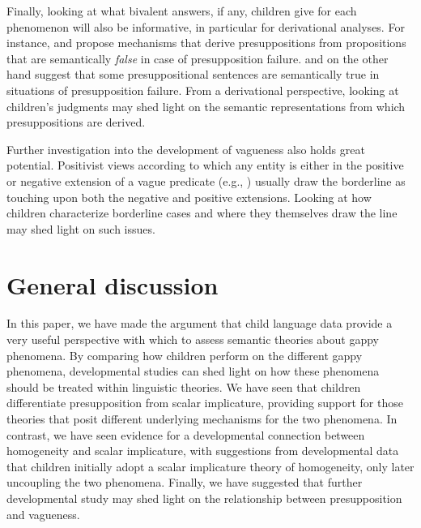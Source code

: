 \documentclass[12pt, letterpaper]{article}
\newcommand\posscite[1]{\citeauthor{#1}'s (\citeyear{#1})}
\begin{document}
{Finally, looking at what bivalent answers, if any, children give for each phenomenon will also be informative, in particular for derivational analyses. For instance, \cite{Abusch:2002} and \cite{Romoli:2014} propose mechanisms that derive presuppositions from propositions that are semantically \textit{false} in case of presupposition failure. %
\cite{sudo2012:phd} and \cite{klinedinst2010} on the other hand suggest that some presuppositional sentences are semantically true in situations of presupposition failure. From a derivational perspective, looking at children's judgments may shed light on the semantic representations from which presuppositions are derived.

Further investigation into the development of vagueness also holds great potential. Positivist views according to which any entity is either in the positive or negative extension of a vague predicate (e.g., \citealt{williamson1994:vagueness}) usually draw the borderline as touching upon both the negative and positive extensions. Looking at how children characterize borderline cases and where they themselves draw the line may shed light on such issues.


\section{General discussion}\label{discussion}

In this paper, we have made the argument that child language data provide a very useful perspective with which to assess semantic theories about gappy phenomena. By comparing how children perform on the different gappy phenomena, developmental studies can shed light on how these phenomena should be treated within linguistic theories. We have seen that children differentiate presupposition from scalar implicature, providing support for those theories that posit different underlying mechanisms for the two phenomena. In contrast, we have seen evidence for a developmental connection between homogeneity and scalar implicature, with suggestions from developmental data that children initially adopt a scalar implicature theory of homogeneity, only later uncoupling the two phenomena. Finally, we have suggested that further developmental study may shed light on the relationship between presupposition and vagueness. 

}
\end{document}
